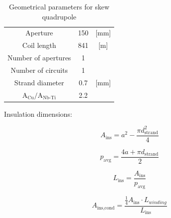 \begin{table}[h!]
    \caption{Geometrical parameters for skew quadrupole \cite{hl_lhc_tech_design_report_v01, marco_prioli_mails}} 
    \vspace{-1.em} 
    \fontsize{10}{10}
    \selectfont 
    \renewcommand{\arraystretch}{1.5}
    \begin{center}
    \begin{tabular}{ ccc }  
    \hline
    Aperture & 150 & [mm]\\
    Coil length & 841 & [m] \\
    Number of apertures & 1 & \\
    Number of circuits & 1 & \\
    Strand diameter & 0.7 & [mm] \\
    $\text{A}_\text{Cu}/\text{A}_\text{Nb-Ti}$ \cite{marco_prioli_mails} & 2.2 & \\
    \hline 
    \end{tabular}
    \end{center}  
     \label{table:skew_quad_params_table} 
 \end{table}

Insulation dimensions:

\begin{equation}
    A_\text{ins} = a^2 - \frac{\pi d_\text{strand}^2}{4}
\end{equation}

\begin{equation}
    p_\text{avg} = \frac{4 a + \pi d_\text{strand}}{2} 
\end{equation}

\begin{equation}
    L_\text{ins} = \frac{A_\text{ins}}{p_\text{avg}}
\end{equation}

\begin{equation}
    A_\text{ins,cond} = \frac{\frac{1}{4} A_\text{ins} \cdot L_{winding}}{L_\text{ins}}
\end{equation}

